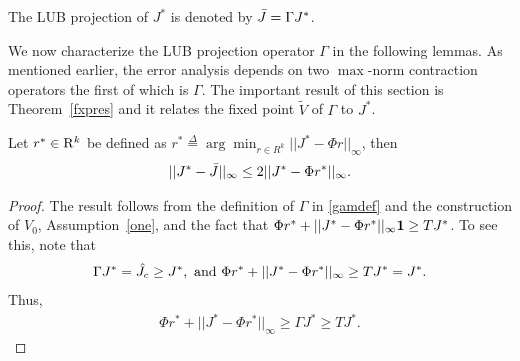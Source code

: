 \begin{definition}\label{bestproj}
The LUB projection of $J^*$ is denoted by $\bar{J}=\Gamma J^*$.
\end{definition}
We now characterize the LUB projection operator $\Gamma$ in the following lemmas. 
As mentioned earlier, the error analysis depends on two $\max$-norm contraction operators the first of which is $\Gamma$. The important result of this section is Theorem~\ref{fxpres} and it relates the fixed point $\tilde{V}$ of $\Gamma$ to $J^*$.
\begin{lemma}\label{bestbnd}
Let $r^*\in \mathrm{R}^k$ be defined as $r^*\stackrel{\Delta}{=}\arg\min_{r\in R^k}||J^*-\Phi r||_\infty$, then 
\begin{align}
||J^*-\bar{J}||_\infty\leq 2||J^*-\Phi r^*||_\infty.
\end{align}
\end{lemma}
\begin{proof}
The result follows from the definition of $\Gamma$ in \eqref{gamdef} and the construction of $V_0$, Assumption~\ref{one}, and the fact that $\Phi r^*+||J^*-\Phi r^*||_\infty \mathbf{1}\geq TJ^*$. To see this, note that
\begin{align}
\Gamma J^*=\hat{J}_c \geq J^*,\nonumber \text{ and }
\Phi r^* +||J^*-\Phi r^*||_\infty\geq TJ^*= J^*.\nonumber
\end{align}
Thus,
\begin{align}
\Phi r^* +||J^*-\Phi r^*||_\infty\geq \Gamma J^*\geq TJ^*.
\end{align}
\end{proof}

